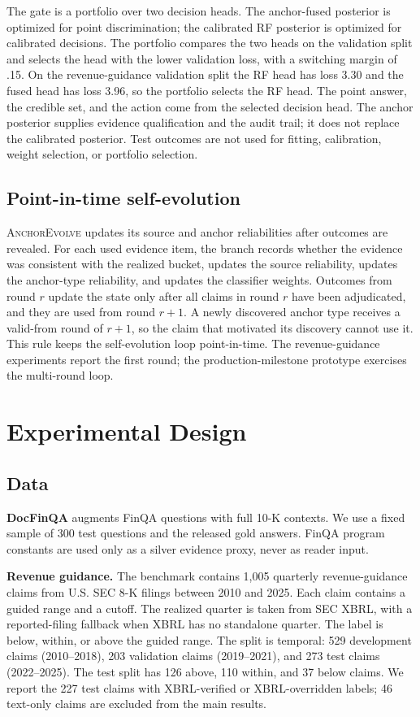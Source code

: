 \documentclass[11pt]{article}
\newcommand{\anchor}{\textsc{AnchorEvolve}}
\begin{document}
The gate is a portfolio over two decision heads. The anchor-fused posterior is optimized for point discrimination; the calibrated RF posterior is optimized for calibrated decisions. The portfolio compares the two heads on the validation split and selects the head with the lower validation loss, with a switching margin of .15. On the revenue-guidance validation split the RF head has loss 3.30 and the fused head has loss 3.96, so the portfolio selects the RF head. The point answer, the credible set, and the action come from the selected decision head. The anchor posterior supplies evidence qualification and the audit trail; it does not replace the calibrated posterior. Test outcomes are not used for fitting, calibration, weight selection, or portfolio selection.

\subsection{Point-in-time self-evolution}
\anchor{} updates its source and anchor reliabilities after outcomes are revealed. For each used evidence item, the branch records whether the evidence was consistent with the realized bucket, updates the source reliability, updates the anchor-type reliability, and updates the classifier weights. Outcomes from round $r$ update the state only after all claims in round $r$ have been adjudicated, and they are used from round $r+1$. A newly discovered anchor type receives a valid-from round of $r+1$, so the claim that motivated its discovery cannot use it. This rule keeps the self-evolution loop point-in-time. The revenue-guidance experiments report the first round; the production-milestone prototype exercises the multi-round loop.

\section{Experimental Design}
\label{sec:experiments}

\subsection{Data}
\textbf{DocFinQA} \citep{reddy2024docfinqa} augments FinQA questions with full 10-K contexts. We use a fixed sample of 300 test questions and the released gold answers. FinQA program constants are used only as a silver evidence proxy, never as reader input.

\textbf{Revenue guidance.} The benchmark contains 1,005 quarterly revenue-guidance claims from U.S. SEC 8-K filings between 2010 and 2025. Each claim contains a guided range and a cutoff. The realized quarter is taken from SEC XBRL, with a reported-filing fallback when XBRL has no standalone quarter. The label is below, within, or above the guided range. The split is temporal: 529 development claims (2010--2018), 203 validation claims (2019--2021), and 273 test claims (2022--2025). The test split has 126 above, 110 within, and 37 below claims. We report the 227 test claims with XBRL-verified or XBRL-overridden labels; 46 text-only claims are excluded from the main results.
\end{document}
